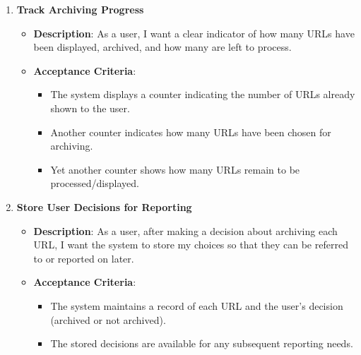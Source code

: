 \begin{enumerate}
    \item \textbf{Track Archiving Progress}
    \begin{itemize}
        \item \textbf{Description}: As a user, I want a clear indicator of how many URLs have been displayed, archived, and how many are left to process.
        \item \textbf{Acceptance Criteria}:
        \begin{itemize}
            \item The system displays a counter indicating the number of URLs already shown to the user.
            \item Another counter indicates how many URLs have been chosen for archiving.
            \item Yet another counter shows how many URLs remain to be processed/displayed.
        \end{itemize}
    \end{itemize}

    \item \textbf{Store User Decisions for Reporting}
    \begin{itemize}
        \item \textbf{Description}: As a user, after making a decision about archiving each URL, I want the system to store my choices so that they can be referred to or reported on later.
        \item \textbf{Acceptance Criteria}:
        \begin{itemize}
            \item The system maintains a record of each URL and the user's decision (archived or not archived).
            \item The stored decisions are available for any subsequent reporting needs.
        \end{itemize}
    \end{itemize}

\end{enumerate}